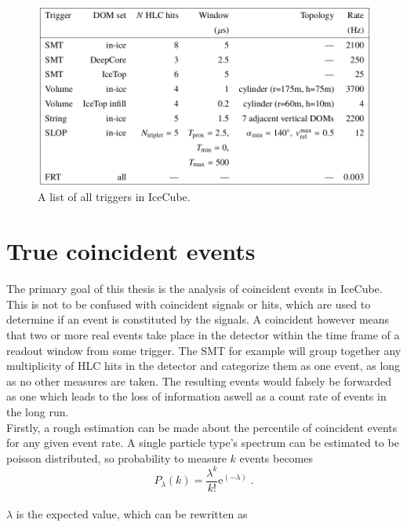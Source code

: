 \begin{figure}[htbp]
    \centering
    \includegraphics[width=\textwidth]{content/pictures/trigger_list.png}
    \caption{A list of all triggers in IceCube.}\label{fig:triggers}
\end{figure}

\section{True coincident events}

The primary goal of this thesis is the analysis of coincident events in IceCube. This is not to be confused with coincident signals or hits, which are used 
to determine if an event is constituted by the signals. A coincident however means that two or more real events take place in the detector within the time 
frame of a readout window from some trigger. The SMT for example will group together any multiplicity of HLC hits in the detector and categorize them as one
event, as long as no other measures are taken. The resulting events would falsely be forwarded as one which leads to the loss of information aswell as 
a count rate of events in the long run. \\
Firstly, a rough estimation can be made about the percentile of coincident events for any given event rate. A single particle type's spectrum can be 
estimated to be poisson distributed, so probability to measure $k$ events becomes\\ 

\begin{equation}
    P_{\lambda}(k) = \frac{\lambda^k}{k!}\text{e}^(-\lambda) \; .
\end{equation}\\

$\lambda$ is the expected value, which can be rewritten as \\

